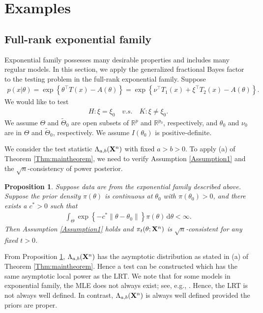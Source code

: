 \documentclass[11pt]{article}
\newcommand{\myT}{\intercal}
\theoremstyle{plain}
\newtheorem{proposition}{\quad\quad Proposition}
\theoremstyle{definition}
\theoremstyle{remark}
\begin{document}
    \section{Examples} \label{sec:examples}

\subsection{Full-rank exponential family}
Exponential family possesses many desirable properties and includes many regular models.
In this section, we apply the generalized fractional Bayes factor to the testing problem in the full-rank exponential family.
Suppose 
\begin{align*}
    p(x|\theta)
    =\exp \left\{ \theta^\myT  T(x)-A(\theta) \right\}
    =\exp \left\{ \nu^\myT  T_1(x) + \xi^\myT T_2 (x) -A(\theta) \right\}
    .
\end{align*}
We would like to test
\begin{align*}
    H:\xi= \xi_0 \quad v.s.\quad K: \xi\neq \xi_0. 
\end{align*}
We assume $\Theta$ and $\tilde{\Theta}_0$ are open subsets of $\mathbb{R}^p$ and $\mathbb R^{p_0}$, respectively,
and $\theta_0$ and $\nu_0$ are in $\Theta$ and $\tilde{\Theta}_0$, respectively.
We assume $I(\theta_0)$ is positive-definite.

We consider the test statistic $\Lambda_{a,b}(\mathbf{X}^n)$ with fixed $a>b> 0$.
To apply (a) of Theorem \ref{Thm:maintheorem},
we need to verify Assumption \ref{Assumption1} and the $\sqrt n$-consistency of power posterior.
\begin{proposition}\label{exponentialCon}
    Suppose data are from the exponential family described above.
    Suppose the prior density $\pi(\theta)$ is continuous at $\theta_0$ with $\pi(\theta_0) > 0$, and there exists a $c^* > 0$ such that
    \begin{align*}
        \int_{\Theta} 
        \exp\left\{- c^* \|\theta-\theta_0\|  \right\}
        \pi(\theta)\, \mathrm d\theta
        < \infty
        .
    \end{align*}
    Then Assumption \ref{Assumption1} holds and $\pi_{t}(\theta ;\mathbf{X}^{n})$ is $\sqrt n$-consistent for any fixed $t>0$.
\end{proposition}
From Proposition \ref{exponentialCon}, $\Lambda_{a,b}(\mathbf{X}^n)$ has the asymptotic distribution as stated in (a) of Theorem \ref{Thm:maintheorem}.
Hence a test can be constructed which has the same asymptotic local power as the LRT.
We note that for some models in exponential family, the MLE does not always exist; see, e.g., \cite{Rinaldo2013}.
Hence, the LRT is not always well defined.
In contrast, $\Lambda_{a,b}(\mathbf{X}^n)$ is always well defined provided the priors are proper.
\end{document}
